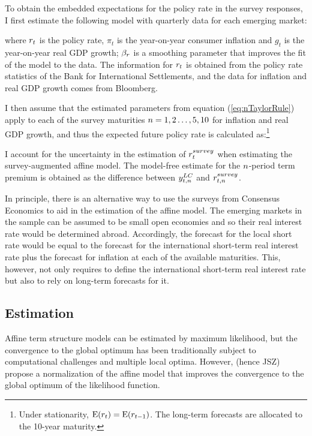 {To obtain the embedded expectations for the policy rate in the survey responses, I first estimate the following model with quarterly data for each emerging market:

\noindent where $r_{t}$ is the policy rate, $\pi_{t}$ is the year-on-year consumer inflation and $g_{t}$ is the year-on-year real GDP growth; 
$\beta_{r}$ is a smoothing parameter that improves the fit of the model to the data. 
The information for $r_{t}$ is obtained from the policy rate statistics of the Bank for International Settlements, and the data for inflation and real GDP growth comes from Bloomberg.

I then assume that the estimated parameters from equation (\ref{eq:nTaylorRule}) apply to each of the survey maturities \(n = 1, 2 \ldots, 5, 10\) for inflation and real GDP growth, and thus the expected future policy rate is calculated as:\footnote{ Under stationarity, $\mathrm{E}(r_{t}) = \mathrm{E}(r_{t-1})$. The long-term forecasts are allocated to the 10-year maturity.}
	
I account for the uncertainty in the estimation of \(r_{t}^{survey}\) when estimating the survey-augmented affine model.
The model-free estimate for the $n$-period term premium is obtained as the difference between \(y_{t,n} ^{LC}\) and \(r_{t,n}^{survey}\).
%	

In principle, there is an alternative way to use the surveys from Consensus Economics to aid in the estimation of the affine model. 
The emerging markets in the sample can be assumed to be small open economies and so their real interest rate would be determined abroad. Accordingly, the forecast for the local short rate would be equal to the forecast for the international short-term real interest rate plus the forecast for inflation at each of the available maturities. This, however, not only requires to define the international short-term real interest rate but also to rely on long-term forecasts for it.


\subsection{Estimation} \label{sec:Estimation}
\iftoggle{toclinks}{\gototoc}{} %
Affine term structure models can be estimated by maximum likelihood, but the convergence to the global optimum has been traditionally subject to computational challenges and multiple local optima. However, \citet*{JSZ:2011} (hence JSZ) propose a normalization of the affine model that improves the convergence to the global optimum of the likelihood function.

}
